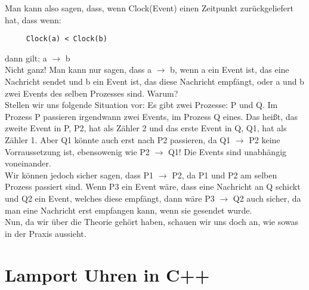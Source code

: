 \documentclass[a4paper,11pt]{report}
\begin{document}
Man kann also sagen, dass, wenn Clock(Event) einen Zeitpunkt zurückgeliefert hat, dass wenn:
\begin{verbatim}
	 Clock(a) < Clock(b)	
\end{verbatim}
dann gilt: a $\rightarrow$ b\\
Nicht ganz! Man kann nur sagen, dass a $\rightarrow$ b, wenn a ein Event ist, das eine Nachricht sendet und b ein Event ist, das diese Nachricht empfängt, oder a und b zwei Events des selben Prozesses sind. Warum?\\
Stellen wir uns folgende Situation vor: Es gibt zwei Prozesse: P und Q. Im Prozess P passieren irgendwann zwei Events, im Prozess Q eines. Das heißt, das zweite Event in P, P2, hat als Zähler 2 und das erste Event in Q, Q1, hat als Zähler 1. Aber Q1 könnte auch erst nach P2 passieren, da Q1 $\rightarrow$ P2 keine Vorraussetzung ist, ebensowenig wie P2 $\rightarrow$ Q1! Die Events sind unabhängig voneinander.\\
Wir können jedoch sicher sagen, dass P1 $\rightarrow$ P2, da P1 und P2 am selben Prozess passiert sind. Wenn P3 ein Event wäre, dass eine Nachricht an Q schickt und Q2 ein Event, welches diese empfängt, dann wäre P3 $\rightarrow$ Q2 auch sicher, da man eine Nachricht erst empfangen kann, wenn sie gesendet wurde.\\
Nun, da wir über die Theorie gehört haben, schauen wir uns doch an, wie sowas in der Praxis aussieht.
\section{Lamport Uhren in C++}
\end{document}

